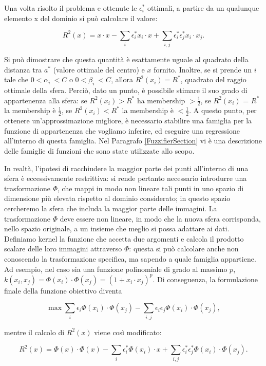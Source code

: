 \documentclass[12pt,a4paper]{report}
\begin{document}
Una volta risolto il problema e ottenute le $\epsilon_i^*$ ottimali, a partire da un qualunque elemento x del dominio si può calcolare il valore:

\[ R^2(x) = x \cdot x - \sum_{i}\epsilon_i^*x_i \cdot x + \sum_{i,j}\epsilon_i^*\epsilon_j^*x_i \cdot x_j.\]

Si può dimostrare che questa quantità è esattamente uguale al quadrato della distanza tra $a^*$ (valore ottimale del centro) e $x$ fornito. Inoltre,  se si prende un $i$ tale che $0 < \alpha_{i}\ < C$ o $0 < \beta_{i}\ < C$,  allora $R^2(x_i) = R^*$, quadrato del raggio ottimale della sfera.
Perciò, dato un punto, è possibile stimare il suo grado di appartenenza alla sfera: se $R^2(x_i) > R^*$ ha membership $>\frac{1}{2}$, se $R^2(x_i)$ = $R^*$ la membership è  $\frac{1}{2}$, se $R^2(x_i)  < R^*$ la membership è  $< \frac{1}{2}$.
A questo punto, per ottenere un'approssimazione migliore, è necessario stabilire una famiglia per la funzione di appartenenza che vogliamo inferire, ed eseguire una regressione all'interno di questa famiglia. Nel Paragrafo \ref{FuzzifierSection} vi è una descrizione delle famiglie di funzioni che sono state utilizzate allo scopo.

In realtà, l'ipotesi di racchiudere la maggior parte dei punti all'interno di una sfera è eccessivamente restrittiva: si rende pertanto necessario introdurre una trasformazione  $\Phi$, che mappi in modo non lineare tali punti in uno spazio di dimensione più elevata rispetto al dominio considerato; in questo spazio cercheremo la sfera che includa la maggior parte delle immagini.
La trasformazione $\Phi$ deve essere non lineare, in modo che la nuova sfera corrisponda, nello spazio originale, a un insieme che meglio si possa adattare ai dati. Definiamo kernel la funzione che accetta due argomenti e calcola il prodotto scalare delle loro immagini attraverso $\Phi$: questa si può calcolare anche non conoscendo la trasformazione specifica, ma sapendo a quale famiglia appartiene. Ad esempio, nel caso sia una funzione polinomiale di grado al massimo $p$, $k(x_i, x_j) = \Phi(x_i)\cdot \Phi(x_j) = (1 + x_i \cdot x_j)^p$.
Di conseguenza, la formulazione finale della funzione obiettivo diventa

\[ \max \sum_{i}\epsilon_i\Phi(x_i) \cdot \Phi(x_j) - \sum_{i,j}\epsilon_i\epsilon_j\Phi(x_i) \cdot \Phi(x_j),\]

mentre il calcolo di $R^2(x)$ viene così modificato:

\[ R^2(x) = \Phi(x) \cdot \Phi(x) - \sum_{i}\epsilon_i^*\Phi(x_i) \cdot x + \sum_{i,j}\epsilon_i^*\epsilon_j^*\Phi(x_i)\cdot \Phi(x_j).\]
\end{document}
